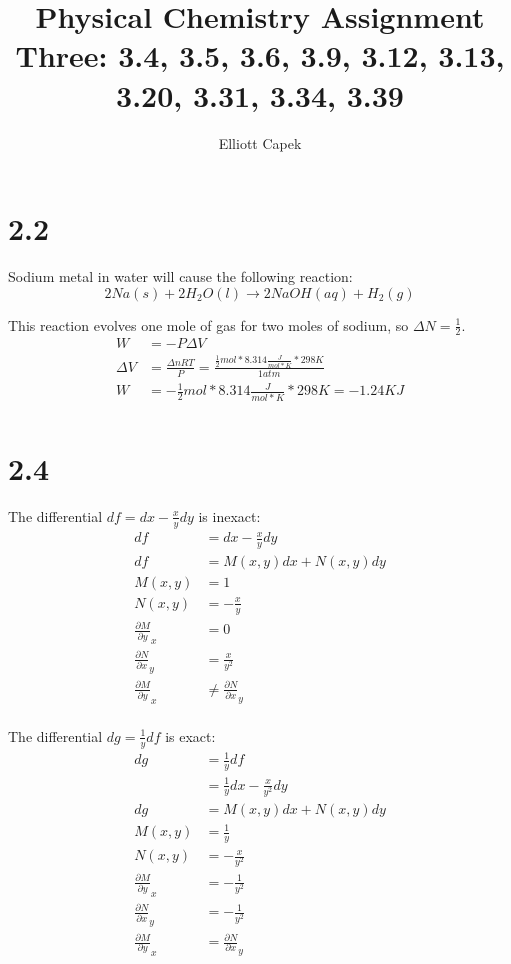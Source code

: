 \documentclass[10pt]{article} %
\title{Physical Chemistry Assignment Three: 3.4, 3.5, 3.6, 3.9, 3.12, 3.13, 3.20, 3.31, 3.34, 3.39}
\author{Elliott Capek}
\begin{document}
\maketitle{}

\section{2.2}
Sodium metal in water will cause the following reaction:
\begin{equation}
  2Na(s) + 2H_2O(l) \rightarrow 2NaOH (aq) + H_2(g)
\end{equation}

This reaction evolves one mole of gas for two moles of sodium, so $\Delta N = \frac{1}{2}$.\\

\begin{align}
  W &= -P\Delta V\\
  \Delta V &= \frac{\Delta nRT}{P} = \frac{\frac{1}{2} mol * 8.314 \frac{J}{mol * K} * 298K}{1 atm}\\
  W &= -\frac{1}{2} mol * 8.314 \frac{J}{mol * K} * 298K = -1.24KJ\\
\end{align}

\section{2.4}

The differential $df = dx - \frac{x}{y}dy$ is inexact:
\begin{align}
  df &= dx - \frac{x}{y}dy\\
  df &= M(x,y)dx + N(x,y)dy\\
  M(x,y) &= 1\\
  N(x,y) &= -\frac{x}{y}\\
  \frac{\partial M}{\partial y}_x &= 0\\
  \frac{\partial N}{\partial x}_y &= \frac{x}{y^2}\\
  \frac{\partial M}{\partial y}_x &\neq \frac{\partial N}{\partial x}_y\\
\end{align}

The differential $dg = \frac{1}{y}df$ is exact:
\begin{align}
  dg &= \frac{1}{y}df\\
     &= \frac{1}{y}dx - \frac{x}{y^2}dy\\
  dg &= M(x,y)dx + N(x,y)dy\\
  M(x,y) &= \frac{1}{y}\\
  N(x,y) &= -\frac{x}{y^2}\\
  \frac{\partial M}{\partial y}_x &= -\frac{1}{y^2}\\
  \frac{\partial N}{\partial x}_y &= -\frac{1}{y^2}\\
  \frac{\partial M}{\partial y}_x &= \frac{\partial N}{\partial x}_y\\
\end{align}
\end{document}
